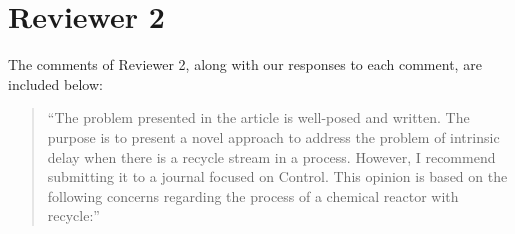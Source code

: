 \documentclass[12pt,answers]{exam}
\begin{document}
\newpage

\section{Reviewer 2}

The comments of Reviewer 2, along with our responses to each comment, are included below:

\begin{quote}
    ``The problem presented in the article is well-posed and written. The purpose is to present a novel approach to address the problem of intrinsic delay when there is a recycle stream in a process. However, I recommend submitting it to a journal focused on Control. This opinion is based on the following concerns regarding the process of a chemical reactor with recycle:''
\end{quote}
\end{document}
